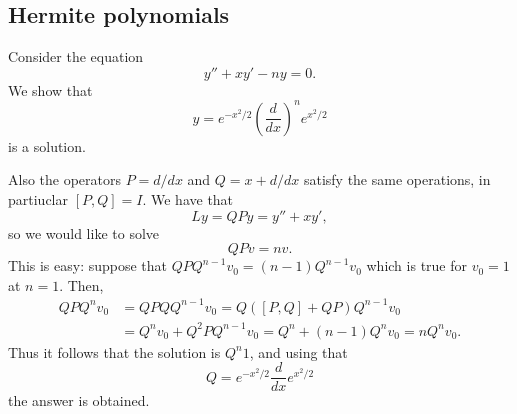 \subsection{Hermite polynomials}

Consider the equation
$$
  y'' + xy' -ny = 0.
$$
We show that
$$
  y = e^{-x^2/2} \left(\frac{d}{dx} \right)^n  e^{x^2/2}
$$
is a solution.

Also the operators $P = d/dx$ and $Q = x + d/dx$ satisfy the same operations, in partiuclar $[P, Q] = I$. We have that
$$
  L y = QP y = y'' + xy',
$$
so we would like to solve
$$
  QP v = n v.
$$
This is easy: suppose that $QP Q^{n-1} v_0 = (n-1) Q^{n-1} v_0$ which is true for $v_0=1$ at $n=1$. Then,
$$
  \begin{aligned}
    Q P Q^n v_0 & = Q P Q Q^{n-1} v_0 = Q ([P, Q] + Q P) Q^{n-1} v_0             \\
                & = Q^n v_0 + Q^2 P Q^{n-1} v_0 = Q^n + (n-1)Q^nv_0 = n Q^n v_0.
  \end{aligned}
$$
Thus it follows that the solution is $Q^n 1$, and using that
$$
  Q = e^{-x^2/2} \frac{d}{dx} e^{x^2/2}
$$
the answer is obtained.

